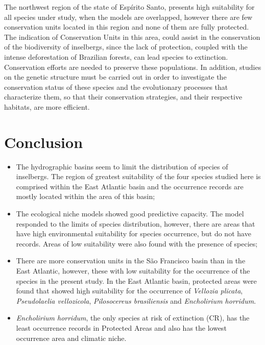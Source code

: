 The northwest region of the state of Espírito Santo, presents high suitability for all species under study, when the models are overlapped, however there are few conservation units located in this region and none of them are fully protected. The indication of Conservation Units in this area, could assist in the conservation of the biodiversity of inselbergs, since the lack of protection, coupled with the intense deforestation of Brazilian forests, can lead species to extinction. Conservation efforts are needed to preserve these populations. In addition, studies on the genetic structure must be carried out in order to investigate the conservation status of these species and the evolutionary processes that characterize them, so that their conservation strategies, and their respective habitats, are more efficient.

\section{Conclusion}

\begin{itemize}

\item The hydrographic basins seem to limit the distribution of species of inselbergs. The region of greatest suitability of the four species studied here is comprised within the East Atlantic basin and the occurrence records are mostly located within the area of this basin;

\item The ecological niche models showed good predictive capacity. The model responded to the limits of species distribution, however, there are areas that have high environmental suitability for species occurrence, but do not have records. Areas of low suitability were also found with the presence of species;

\item There are more conservation units in the São Francisco basin than in the East Atlantic, however, these with low suitability for the occurrence of the species in the present study. In the East Atlantic basin, protected areas were found that showed high suitability for the occurrence of \textit{Vellozia plicata}, \textit{Pseudolaelia vellozicola}, \textit{Pilosocereus brasiliensis} and \textit{Encholirium horridum}.

\item \textit{Encholirium horridum}, the only species at risk of extinction (CR), has the least occurrence records in Protected Areas and also has the lowest occurrence area and climatic niche.

\end{itemize}

